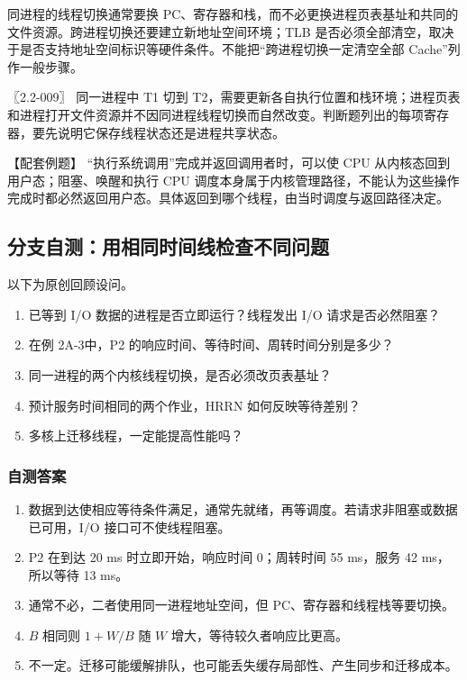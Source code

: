 同进程的线程切换通常要换 PC、寄存器和栈，而不必更换进程页表基址和共同的文件资源。跨进程切换还要建立新地址空间环境；TLB 是否必须全部清空，取决于是否支持地址空间标识等硬件条件。不能把``跨进程切换一定清空全部 Cache''列作一般步骤。

〖2.2-009〗 同一进程中 T1 切到 T2，需要更新各自执行位置和栈环境；进程页表和进程打开文件资源并不因同进程线程切换而自然改变。判断题列出的每项寄存器，要先说明它保存线程状态还是进程共享状态。

【配套例题】 ``执行系统调用''完成并返回调用者时，可以使 CPU 从内核态回到用户态；阻塞、唤醒和执行 CPU 调度本身属于内核管理路径，不能认为这些操作完成时都必然返回用户态。具体返回到哪个线程，由当时调度与返回路径决定。

\subsection{分支自测：用相同时间线检查不同问题}\label{OS02-2-review}

以下为原创回顾设问。

\begin{enumerate}
\def\labelenumi{\arabic{enumi}.}
\tightlist
\item
  已等到 I/O 数据的进程是否立即运行？线程发出 I/O 请求是否必然阻塞？
\item
  在例 2A-3中，P2 的响应时间、等待时间、周转时间分别是多少？
\item
  同一进程的两个内核线程切换，是否必须改页表基址？
\item
  预计服务时间相同的两个作业，HRRN 如何反映等待差别？
\item
  多核上迁移线程，一定能提高性能吗？
\end{enumerate}

\subsubsection{自测答案}\label{OS02-auto-5}

\begin{enumerate}
\def\labelenumi{\arabic{enumi}.}
\tightlist
\item
  数据到达使相应等待条件满足，通常先就绪，再等调度。若请求非阻塞或数据已可用，I/O 接口可不使线程阻塞。
\item
  P2 在到达 20 ms 时立即开始，响应时间 0；周转时间 55 ms，服务 42 ms，所以等待 13 ms。
\item
  通常不必，二者使用同一进程地址空间，但 PC、寄存器和线程栈等要切换。
\item
  \(B\) 相同则 \(1+W/B\) 随 \(W\) 增大，等待较久者响应比更高。
\item
  不一定。迁移可能缓解排队，也可能丢失缓存局部性、产生同步和迁移成本。
\end{enumerate}

